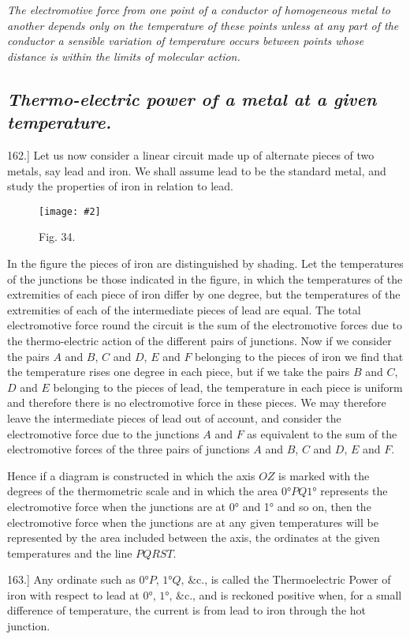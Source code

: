 \documentclass[12pt,oneside]{book}[2021/10/04]
\newcommand{\Heading}{\centering\normalfont}
\newcommand{\Subsection}[1]{\subsection*{\normalsize\Heading\itshape #1}}
\newcommand{\Runhead}[1]{\fancyhead[C]{\iffloatpage{}{\small#1}}}
\newcommand{\article}[1]{\phantomsection \label{art:#1}{#1.]}}
\newcommand{\widefig}[3]{
\begin{figure}[ht!]
\centering
\texttt{[image: \#2]}
\caption*{\small #3}
\end{figure}}
\newcommand{\¬}{\hphantom{0}}
\begin{document}
\textit{The electromotive force from one point of a conductor of homogeneous
metal to another depends only on the temperature of these points unless
at any part of the conductor a sensible variation of temperature occurs
between points whose distance is within the limits of molecular action.}

\Subsection{Thermo-electric power of a metal at a given temperature.}

\article{162} Let us now consider a linear circuit made up of alternate
pieces of two metals, say lead and iron. We shall assume lead
to be the standard metal, and study the properties of iron in
relation to lead.

\widefig{0.95}{149.png}{Fig. 34.}
In the figure the pieces of iron are distinguished by shading.
Let the temperatures of the junctions be those indicated in the
figure, in which the temperatures of the extremities of each piece
of iron differ by one degree, but the temperatures of the extremities
of each of the intermediate pieces of lead are equal. The total
electromotive force round the circuit is the sum of the electromotive
forces due to the thermo-electric action of the different pairs of
junctions. Now if we consider the pairs \(A\) and \(B\), \(C\) and \(D\), \(E\)
and \(F\) belonging to the pieces of iron we find that the temperature
rises one degree in each piece, but if we take the pairs \(B\) and \(C\),
\(D\) and \(E\) belonging to the pieces of lead, the temperature in
each piece is uniform and therefore there is no electromotive force
in these pieces. We may therefore leave the intermediate pieces
of lead out of account, and consider the electromotive force due
to the junctions \(A\) and \(F\) as equivalent to the sum of the electromotive
forces of the three pairs of junctions \(A\) and \(B\), \(C\) and \(D\),
\(E\) and \(F\).

Hence if a diagram is constructed in which the axis \(OZ\) is
marked with the degrees of the thermometric scale and in which
the area \(0° PQ 1°\) represents the electromotive force when the
junctions are at 0° and 1° and so on, then the electromotive force
when the junctions are at any given temperatures will be represented
by the area included between the axis, the ordinates at
the given temperatures and the line \(PQRST\).
\Runhead{THERMOELECTRIC POWER.}

\article{163} Any ordinate such as \( 0°P\), \(1°Q\), \&c., is called the Thermoelectric
Power of iron with respect to lead at \(0°\), \(1°\), \&c., and is
reckoned positive when, for a small difference of temperature, the
current is from lead to iron through the hot junction.
\end{document}
